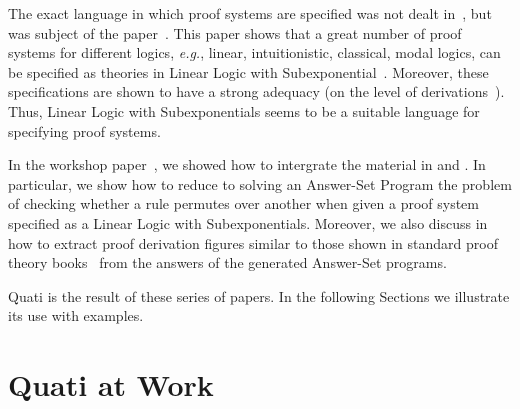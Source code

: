 \documentclass{llncs}
\newcommand{\eg}{{\em e.g.}}
\begin{document}
The exact language in which proof systems are specified was not dealt in~\cite{nigam13iclp}, but was subject of 
the paper~\cite{nigam.jlc}. This paper shows that a great number of proof systems for different logics,
\eg, linear, intuitionistic, classical, modal logics, can be specified as theories in Linear Logic with Subexponential~\cite{nigam09ppdp}. Moreover, these specifications are shown to have a strong adequacy (on the level of derivations~\cite{nigam10jar}). Thus, Linear Logic
with Subexponentials seems to be a suitable language for specifying proof systems. 

In the workshop paper~\cite{nigam14ebl}, we showed how to intergrate the material in \cite{nigam13iclp} and \cite{nigam.jlc}.
In particular, we show how to reduce to solving an Answer-Set Program the problem of checking whether a rule permutes over another when given 
a proof system specified as a Linear Logic with Subexponentials. Moreover, we also discuss in \cite{nigam14ebl} how to extract proof derivation 
figures similar to those shown in standard proof theory books~\cite{troelstra} from the 
answers of the generated Answer-Set programs. 

Quati is the result of these series of papers. In the following Sections we illustrate its use 
with examples.

% 

\section{Quati at Work}
\end{document}
